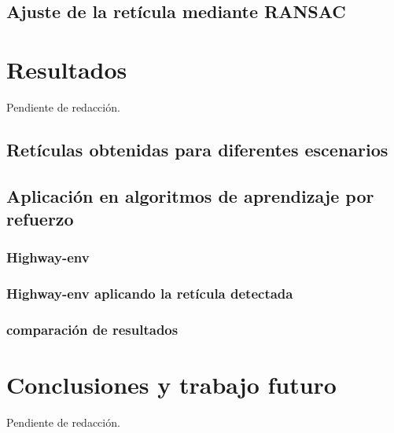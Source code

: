 \documentclass[10pt,letterpaper,final]{article}
\begin{document}
\subsection{Ajuste de la retícula mediante RANSAC}\label{sec:metodo-ransac}


%

\clearpage
\section{Resultados}
Pendiente de redacción.
\subsection{Retículas obtenidas para diferentes escenarios}
\subsection{Aplicación en algoritmos de aprendizaje por refuerzo}
\subsubsection{Highway-env}
\subsubsection{Highway-env aplicando la retícula detectada}
\subsubsection{comparación de resultados}

\clearpage
\section{Conclusiones y trabajo futuro}
Pendiente de redacción.

\clearpage


\end{document}

